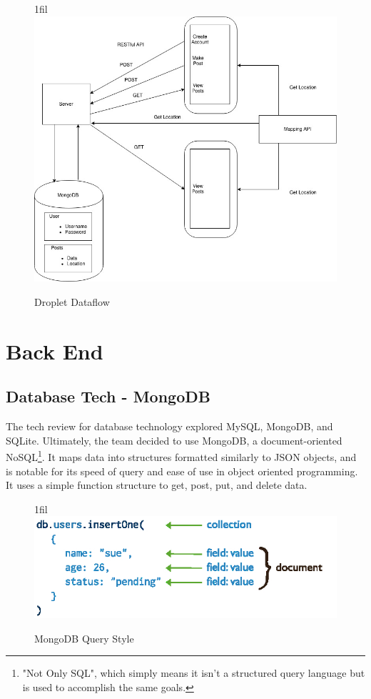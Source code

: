 \documentclass[draftclsnofoot, onecolumn, letterpaper,10pt,compsoc]{IEEEtran}
\makeatletter
\newcommand*{\centerfloat}{%
  \parindent \z@
  \leftskip \z@ \@plus 1fil \@minus \textwidth
  \rightskip\leftskip
  \parfillskip \z@skip}
\newcommand*{\centerfloat}{%
  \parindent \z@
  \leftskip \z@ \@plus 1fil \@minus \textwidth
  \rightskip\leftskip
  \parfillskip \z@skip}
\makeatother
\begin{document}
\begin{figure}[H]
    \centerfloat
    \includegraphics[scale=.6]{images/DropletDataFlow.jpg}
    \caption{Droplet Dataflow}
    \label{fig:my_label}
\end{figure}

\newpage
\section{Back End}

\subsection{Database Tech - MongoDB}

The tech review for database technology explored MySQL, MongoDB, and SQLite. Ultimately, the team decided to use MongoDB, a document-oriented NoSQL\footnote{"Not Only SQL", which simply means it isn't a structured query language but is used to accomplish the same goals.}. It maps data into structures formatted similarly to JSON objects, and is notable for its speed of query and ease of use in object oriented programming. It uses a simple function structure to get, post, put, and delete data.

\begin{figure}[H]
    \centerfloat
    \includegraphics[scale=.8]{images/mongodb.jpg}
    \caption{MongoDB Query Style}
    \label{fig:my_label}
\end{figure}
\end{document}
